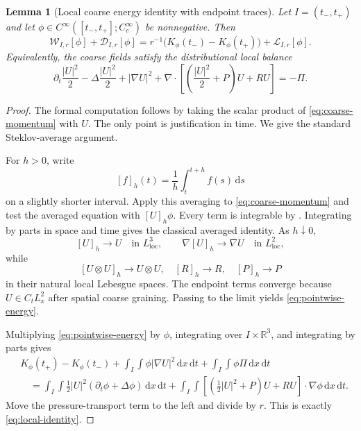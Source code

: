 \documentclass[11pt]{article}
\numberwithin{equation}{section}
\newtheorem{lemma}[theorem]{Lemma}
\newcommand{\R}{\mathbb R}
\newcommand{\dd}{\,\mathrm d}
\newcommand{\dxdt}{\,\mathrm dx\,\mathrm dt}
\newcommand{\W}{\mathcal W}
\newcommand{\D}{\mathcal D}
\newcommand{\Lk}{\mathcal L}
\begin{document}
\begin{lemma}[Local coarse energy identity with endpoint traces]\label{lem:local-identity}
Let \(I=(t_-,t_+)\) and let \(\phi\in C^\infty([t_-,t_+];C_c^\infty)\) be nonnegative. Then
\begin{equation}\label{eq:local-identity}
\boxed{
\W_{I,r}[\phi]
+
\D_{I,r}[\phi]
=
r^{-1}\bigl(K_\phi(t_-)-K_\phi(t_+)\bigr)
+
\Lk_{I,r}[\phi].
}
\end{equation}
Equivalently, the coarse fields satisfy the distributional local balance
\begin{equation}\label{eq:pointwise-energy}
\partial_t\frac{|U|^2}{2}
-
\Delta\frac{|U|^2}{2}
+
|\nabla U|^2
+
\nabla\cdot
\left[
\left(\frac{|U|^2}{2}+P\right)U+RU
\right]
=-\Pi.
\end{equation}
\end{lemma}

\begin{proof}
The formal computation follows by taking the scalar product of \eqref{eq:coarse-momentum} with \(U\). The only point is justification in time. We give the standard Steklov-average argument.

For \(h>0\), write
\[
[f]_h(t)=\frac1h\int_t^{t+h}f(s)\dd s
\]
on a slightly shorter interval. Apply this averaging to \eqref{eq:coarse-momentum} and test the averaged equation with \([U]_h\phi\). Every term is integrable by . Integrating by parts in space and time gives the classical averaged identity. As \(h\downarrow0\),
\[
[U]_h\to U\quad\text{in }L^3_{\mathrm{loc}},
\qquad
\nabla[U]_h\to\nabla U\quad\text{in }L^2_{\mathrm{loc}},
\]
while
\[
[U\otimes U]_h\to U\otimes U,
\quad
[R]_h\to R,
\quad
[P]_h\to P
\]
in their natural local Lebesgue spaces. The endpoint terms converge because \(U\in C_tL^2_x\) after spatial coarse graining. Passing to the limit yields \eqref{eq:pointwise-energy}.

Multiplying \eqref{eq:pointwise-energy} by \(\phi\), integrating over \(I\times\R^3\), and integrating by parts gives
\begin{align*}
&K_\phi(t_+)-K_\phi(t_-)
+
\int_I\int\phi|\nabla U|^2\dxdt
+
\int_I\int\phi\Pi\dxdt
\\
&\quad=
\int_I\int
\frac12|U|^2(\partial_t\phi+\Delta\phi)\dxdt
+
\int_I\int
\left[
\left(\frac12|U|^2+P\right)U+RU
\right]\cdot\nabla\phi\dxdt.
\end{align*}
Move the pressure-transport term to the left and divide by \(r\). This is exactly \eqref{eq:local-identity}.
\end{proof}
\end{document}
